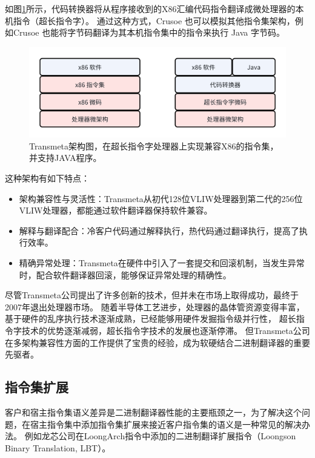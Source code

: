 如图\ref{img:transmeta_arch}所示，代码转换器将从程序接收到的X86汇编代码指令翻译成微处理器的本机指令（超长指令字）。
通过这种方式，Crusoe 也可以模拟其他指令集架构，例如Crusoe 也能将字节码翻译为其本机指令集中的指令来执行 Java 字节码。

\begin{figure}[!htbp]
    \centering
    \includegraphics[width=0.8\linewidth]{./feishuImage/transmeta_arch.png}
    \caption{Transmeta架构图，在超长指令字处理器上实现兼容X86的指令集，并支持JAVA程序。}
    \label{img:transmeta_arch}
  \end{figure}
这种架构有如下特点：

\begin{itemize}
\item 架构兼容性与灵活性：Transmeta从初代128位VLIW处理器到第二代的256位VLIW处理器，都能通过软件翻译器保持软件兼容。
\item 解释与翻译配合：冷客户代码通过解释执行，热代码通过翻译执行，提高了执行效率。
\item 精确异常处理：Transmeta在硬件中引入了一套提交和回滚机制，当发生异常时，配合软件翻译器回滚，能够保证异常处理的精确性。
\end{itemize}

尽管Transmeta公司提出了许多创新的技术，但并未在市场上取得成功，最终于2007年退出处理器市场。
随着半导体工艺进步，处理器的晶体管资源变得丰富，基于硬件的乱序执行技术逐渐成熟，已经能够用硬件发掘指令级并行性，
超长指令字技术的优势逐渐减弱，超长指令字技术的发展也逐渐停滞。
但Transmeta公司在多架构兼容性方面的工作提供了宝贵的经验，成为软硬结合二进制翻译器的重要先驱者。

\subsection{指令集扩展}\label{sec:isa_extension}

客户和宿主指令集语义差异是二进制翻译器性能的主要瓶颈之一，为了解决这个问题，在宿主指令集中添加指令集扩展来接近客户指令集的语义是一种常见的解决办法。
例如龙芯公司在LoongArch指令中添加的二进制翻译扩展指令（Loongson Binary Translation, LBT）\cite{LoongArch2023}。

